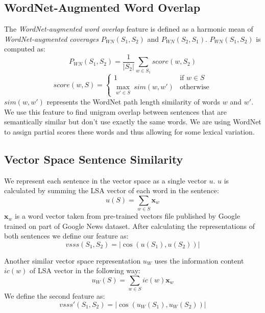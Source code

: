 \documentclass[10pt, a4paper]{article}
\begin{document}
\subsection{WordNet-Augmented Word Overlap}
The \textit{WordNet-augmented word overlap} feature is defined as a harmonic mean of \textit{WordNet-augmented coverages} $P_{WN}(S_1, S_2)$ and $P_{WN}(S_2, S_1)$. $P_{WN}(S_1, S_2)$ is computed as:
\begin{equation}
P_{WN}(S_1, S_2) = \dfrac{1}{|S_2|}\sum_{w \in S_1}score(w, S_2)
\end{equation}
\begin{equation}
score(w, S) = \left\{
\begin{array}{ll}
1 & \mbox{if } w \in S \\
\underset{w' \in S}{\max} \: sim(w, w') & \mbox{otherwise}
\end{array}
\right.
\end{equation}
$sim(w, w')$ represents the WordNet path length similarity of words $w$ and $w'$. We use this feature to find unigram overlap between sentences that are semantically similar but don't use exactly the same words. We are using WordNet to assign partial scores these words and thus allowing for some lexical variation.

\subsection{Vector Space Sentence Similarity}
We represent each sentence in the vector space as a single vector $u$. $u$ is calculated by summing the LSA vector of each word in the sentence:
\begin{equation}
u(S) = \sum_{w \in S} \textbf{x}_w
\end{equation}
$\textbf{x}_w$ is a word vector taken from pre-trained vectors file published by Google trained on part of Google News dataset. After calculating the representations of both sentences we define our feature as:
\begin{equation}
vsss(S_1, S_2) = |\cos(u(S_1), u(S_2))|
\end{equation}

Another similar vector space representation $u_W$ uses the information content $ic(w)$ of LSA vector in the following way:
\begin{equation}
u_W(S) = \sum_{w \in S} ic(w)\textbf{x}_w
\end{equation}
We define the second feature as:
\begin{equation}
vsss'(S_1, S_2) = |\cos(u_W(S_1), u_W(S_2))|
\end{equation}
\end{document}

